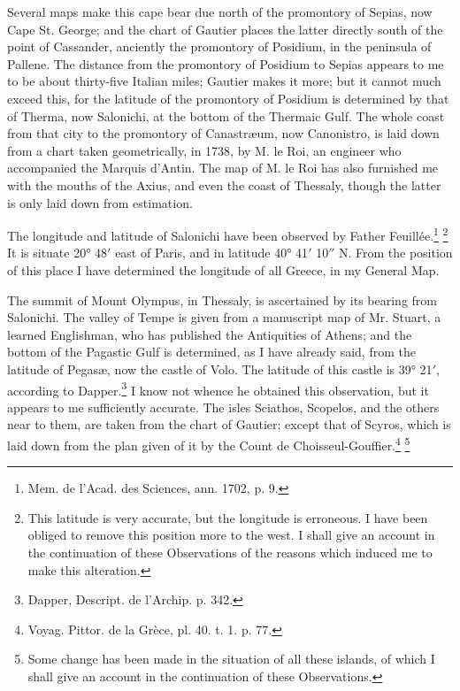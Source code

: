 \documentclass[a4paper, 11pt, oneside, polutonikogreek, english]{article}
\begin{document}
Several maps make this cape bear due north of the promontory of Sepias, now Cape St. George; and the chart of Gautier places the latter directly south of the point of Cassander, anciently the promontory of Posidium, in the peninsula of Pallene. The distance from the promontory of Posidium to Sepias appears to me to be about thirty-five Italian miles; Gautier makes it more; but it cannot much exceed this, for the latitude of the promontory of Posidium is determined by that of Therma, now Salonichi, at the bottom of the Thermaic Gulf. The whole coast from that city to the promontory of Canastræum, now Canonistro, is laid down from a chart taken geometrically, in 1738, by M. le Roi, an engineer who accompanied the Marquis d'Antin. The map of M. le Roi has also furnished me with the mouths of the Axius, and even the coast of Thessaly, though the latter is only laid down from estimation.

The longitude and latitude of Salonichi have been observed by Father Feuillée.\footnote{Mem. de l'Acad. des Sciences, ann. 1702, p. 9.} \footnote{This latitude is very accurate, but the longitude is erroneous. I have been obliged to remove this position more to the west. I shall give an account in the continuation of these Observations of the reasons which induced me to make this alteration.} It is situate 20° 48$'$ east of Paris, and in latitude 40° 41$'$ 10$''$ N. From the position of this place I have determined the longitude of all Greece, in my General Map.

The summit of Mount Olympus, in Thessaly, is ascertained by its bearing from Salonichi. The valley of Tempe is given from a manuscript map of Mr. Stuart, a learned Englishman, who has published the Antiquities of Athens; and the bottom of the Pagastic Gulf is determined, as I have already said, from the latitude of Pegasæ, now the castle of Volo. The latitude of this castle is 39° 21$'$, according to Dapper.\footnote{Dapper, Descript. de l'Archip. p. 342.} I know not whence he obtained this observation, but it appears to me sufficiently accurate. The isles Sciathos, Scopelos, and the others near to them, are taken from the chart of Gautier; except that of Scyros, which is laid down from the plan given of it by the Count de Choisseul-Gouffier.\footnote{Voyag. Pittor. de la Grèce, pl. 40. t. 1. p. 77.} \footnote{Some change has been made in the situation of all these islands, of which I shall give an account in the continuation of these Observations.}
\end{document}
